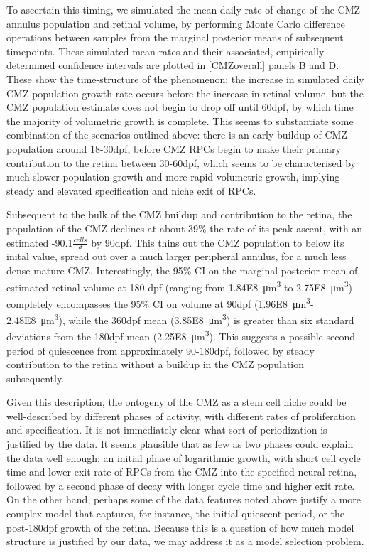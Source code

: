 To ascertain this timing, we simulated the mean daily rate of change of the CMZ annulus population and retinal volume, by performing Monte Carlo difference operations between samples from the marginal posterior means of subsequent timepoints. These simulated mean rates and their associated, empirically determined confidence intervals are plotted in \autoref{CMZoverall} panels B and D. These show the time-structure of the phenomenon; the increase in simulated daily CMZ population growth rate occurs before the increase in retinal volume, but the CMZ population estimate does not begin to drop off until 60dpf, by which time the majority of volumetric growth is complete. This seems to substantiate some combination of the scenarios outlined above: there is an early buildup of CMZ population around 18-30dpf, before CMZ RPCs begin to make their primary contribution to the retina between 30-60dpf, which seems to be characterised by much slower population growth and more rapid volumetric growth, implying steady and elevated specification and niche exit of RPCs. 

Subsequent to the bulk of the CMZ buildup and contribution to the retina, the population of the CMZ declines at about 39\% the rate of its peak ascent, with an estimated -90.1$\frac{cells}{d}$ by 90dpf. This thins out the CMZ population to below its inital value, spread out over a much larger peripheral annulus, for a much less dense mature CMZ. Interestingly, the 95\% CI on the marginal posterior mean of estimated retinal volume at 180 dpf (ranging from \SI{1.84E8}{\cubic\micro\metre} to \SI{2.75E8}{\cubic\micro\metre}) completely encompasses the 95\% CI on volume at 90dpf (\SI{1.96E8}{\cubic\micro\metre}-\SI{2.48E8}{\cubic\micro\metre}), while the 360dpf mean (\SI{3.85E8}{\cubic\micro\metre}) is greater than six standard deviations from the 180dpf mean (\SI{2.25E8}{\cubic\micro\metre}). This suggests a possible second period of quiescence from approximately 90-180dpf, followed by steady contribution to the retina without a buildup in the CMZ population subsequently.

Given this description, the ontogeny of the CMZ as a stem cell niche could be well-described by different phases of activity, with different rates of proliferation and specification. It is not immediately clear what sort of periodization is justified by the data. It seems plausible that as few as two phases could explain the data well enough: an initial phase of logarithmic growth, with short cell cycle time and lower exit rate of RPCs from the CMZ into the specified neural retina, followed by a second phase of decay with longer cycle time and higher exit rate. On the other hand, perhaps some of the data features noted above justify a more complex model that captures, for instance, the initial quiescent period, or the post-180dpf growth of the retina. Because this is a question of how much model structure is justified by our data, we may address it as a model selection problem.

